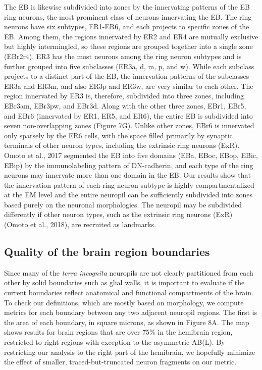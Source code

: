 \documentclass{article}
\begin{document}
The EB is likewise subdivided into zones by the innervating patterns of the EB ring neurons, the most prominent class of neurons innervating the EB. The ring neurons have six subtypes, ER1-ER6, and each projects to specific zones of the EB. Among them, the regions innervated by ER2 and ER4 are mutually exclusive but highly intermingled, so these regions are grouped together into a single zone (EBr2r4). ER3 has the most neurons among the ring neuron subtypes and is further grouped into five subclasses (ER3a, d, m, p, and w). While each subclass projects to a distinct part of the EB, the innervation patterns of the subclasses ER3a and ER3m, and also ER3p and ER3w, are very similar to each other. The region innervated by ER3 is, therefore, subdivided into three zones, including EBr3am, EBr3pw, and EBr3d. Along with the other three zones, EBr1, EBr5, and EBr6 (innervated by ER1, ER5, and ER6), the entire EB is subdivided into seven non-overlapping zones (Figure 7G). Unlike other zones, EBr6 is innervated only sparsely by the ER6 cells, with the space filled primarily by synaptic terminals of other neuron types, including the extrinsic ring neurons (ExR). Omoto et al., 2017 segmented the EB into five domains (EBa, EBoc, EBop, EBic, EBip) by the immunolabeling pattern of DN-cadherin, and each type of the ring neurons may innervate more than one domain in the EB. Our results show that the innervation pattern of each ring neuron subtype is highly compartmentalized at the EM level and the entire neuropil can be sufficiently subdivided into zones based purely on the neuronal morphologies. The neuropil may be subdivided differently if other neuron types, such as the extrinsic ring neurons (ExR) (Omoto et al., 2018), are recruited as landmarks.

\subsection*{Quality of the brain region boundaries}

Since many of the \emph{terra incognita} neuropils are not clearly partitioned from each other by solid boundaries such as glial walls, it is important to evaluate if the current boundaries reflect anatomical and functional compartments of the brain. To check our definitions, which are mostly based on morphology, we compute metrics for each boundary between any two adjacent neuropil regions. The first is the area of each boundary, in square microns, as shown in Figure 8A. The map shows results for brain regions that are over 75\% in the hemibrain region, restricted to right regions with exception to the asymmetric AB(L). By restricting our analysis to the right part of the hemibrain, we hopefully minimize the effect of smaller, traced-but-truncated neuron fragments on our metric.
\end{document}
